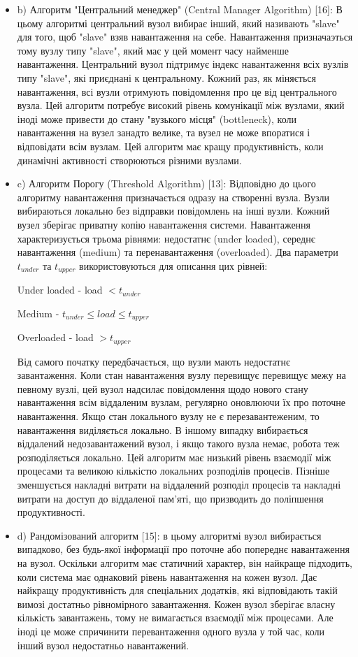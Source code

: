 \documentclass[14pt]{vakthesis}
\begin{document}
\begin{enumerate}
\begin{itemize}
\item b) Алгоритм "Центральний менеджер" (Central Manager Algorithm) [16]: В цьому алгоритмі центральний вузол вибирає інший, який називають "slave" 
для того, щоб "slave" взяв навантаження на себе. Навантаження призначаэться тому вузлу типу "slave", який має у цей момент часу найменше навантаження.
Центральний вузол підтримує індекс навантаження всіх вузлів типу "slave", які приєднані к центральному. 
Кожний раз, як міняється навантаження, всі вузли отримують повідомлення про це від центрального вузла. Цей алгоритм потребує високий рівень комунікації між вузлами, який іноді може привести до стану "вузького місця" (bottleneck), коли навантаження на вузел занадто велике, та вузел не може впоратися і відповідати всім вузлам.   Цей алгоритм має кращу продуктивність, коли динамічні активності створюються різними вузлами. 
\item c) Алгоритм Порогу (Threshold Algorithm) [13]: Відповідно до цього алгоритму навантаження призначається одразу на створенні вузла. Вузли вибираються локально без відправки повідомлень на інші вузли. Кожний вузел зберігає приватну копію навантаження системи. Навантаження характеризується трьома рівнями: недостатнє (under loaded), середнє навантаження (medium) та перенавантаження (overloaded). Два параметри $t_{under}$ та $t_{upper}$ використовуються для описання цих рівней:


Under loaded - load  $ < t_{under} $


Medium - $t_{under} \leq load \leq t_{upper}$


Overloaded - load $ > t_{upper}$


Від самого початку передбачається, що вузли мають недостатнє завантаження. Коли стан навантаження вузлу перевищує перевищує межу на певному вузлі, цей вузол надсилає повідомлення щодо нового стану навантаження всім віддаленим вузлам, регулярно оновлюючи їх про поточне навантаження. Якщо стан локального вузлу не є перезавантеженим, то навантаження виділяється локально. В іншому випадку вибирається віддалений недозавантажений вузол, і якщо такого вузла немає, робота теж розподіляється локально. Цей алгоритм має низький рівень взаємодії між процесами та великою кількістю локальних розподілів процесів. Пізніше зменшується накладні витрати на віддалений розподіл процесів та накладні витрати на доступ до віддаленої пам'яті, що призводить до поліпшення продуктивності.

\item d) Рандомізований алгоритм [15]: в цьому алгоритмі вузол вибирається випадково, без будь-якої інформації про поточне або попереднє навантаження на вузол. Оскільки алгоритм має статичний характер, він найкраще підходить, коли система має однаковий рівень навантаження на кожен вузол. Дає найкращу продуктивність для спеціальних додатків, які відповідають такій вимозі достатньо рівномірного завантаження. Кожен вузол зберігає власну кількість завантажень, тому не вимагається взаємодії між процесами. Але іноді це може спричинити перевантаження одного вузла у той час, коли інший вузол недостатньо навантажений.
\end{itemize} 



\end{enumerate}
\end{document}

